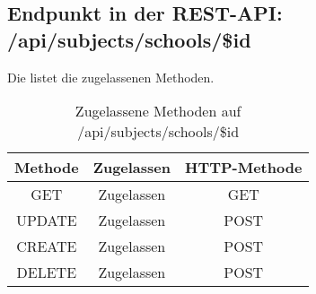 \subsection{Endpunkt in der REST-API: /api/subjects/schools/\$id}
Die  listet die zugelassenen Methoden. 

\begin{table}[!htbp]
	\begin{tabular}{|c|c|c|}
		\hline
			\textbf{Methode} & \textbf{Zugelassen} & \textbf{HTTP-Methode} \\ \hline
			GET & Zugelassen & GET \\ \hline
			UPDATE & Zugelassen & POST \\ \hline 
			CREATE & Zugelassen & POST \\ \hline 
			DELETE & Zugelassen & POST \\ \hline
	\end{tabular}

		\caption{Zugelassene Methoden auf /api/subjects/schools/\$id}
		\label{tab:end:rest:api:subjects:schools:id:meth}
\end{table}